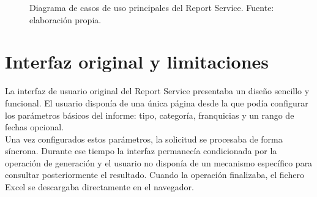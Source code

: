 \documentclass[11pt,a4paper,titlepage,oneside]{report}
\begin{document}
\begin{figure}[H]
  \centering


  \caption{Diagrama de casos de uso principales del Report Service. Fuente: elaboración propia.}
  \label{fig:casos-uso}
\end{figure}

\section{Interfaz original y limitaciones}

La interfaz de usuario original del Report Service presentaba un diseño
sencillo y funcional. El usuario disponía de una única página desde la que
podía configurar los parámetros básicos del informe: tipo, categoría,
franquicias y un rango de fechas opcional. \\

Una vez configurados estos parámetros, la solicitud se procesaba de forma
síncrona. Durante ese tiempo la interfaz permanecía condicionada por la
operación de generación y el usuario no disponía de un mecanismo específico
para consultar posteriormente el resultado. Cuando la operación finalizaba, el
fichero Excel se descargaba directamente en el navegador. \\
\end{document}
